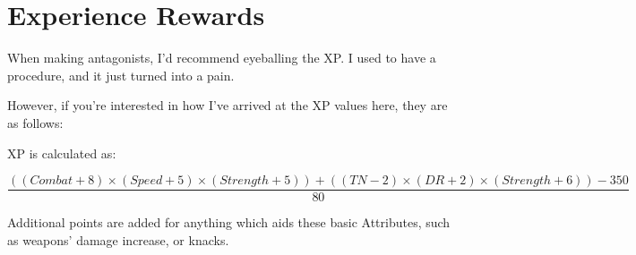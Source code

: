 \chapter{Experience Rewards}

When making antagonists, I'd recommend eyeballing the XP.  I used to have a procedure, and it just turned into a pain.

However, if you're interested in how I've arrived at the XP values here, they are as follows:

XP is calculated as:

\begin{equation}
\frac{(( Combat + 8 ) \times ( Speed + 5) \times ( Strength + 5 ) ) + ( ( TN -2 ) \times ( DR + 2 ) \times ( Strength + 6 )) - 350}{80}
\end{equation}

Additional points are added for anything which aids these basic Attributes, such as weapons' damage increase, or knacks.



